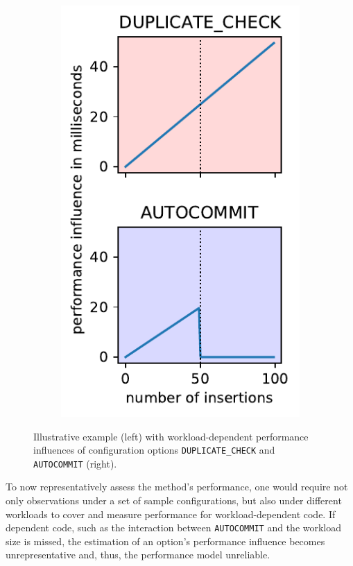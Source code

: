 {\begin{figure}
\begin{subfigure}[l]{0.63\linewidth}
\end{subfigure}
	\begin{subfigure}[l]{0.35\linewidth}
		\includegraphics[width=1\linewidth]{images/influences.pdf}
	\end{subfigure}
	\caption{Illustrative example (left) with workload-dependent performance influences of configuration options \texttt{DUPLICATE\_CHECK} and \texttt{AUTOCOMMIT} (right).}
	\label{fig:intro}
\end{figure}


To now representatively assess the method's performance, one would require not only observations under a set of sample configurations, but also under different workloads to cover and measure performance for workload-dependent code. If dependent code, such as the interaction between \texttt{AUTOCOMMIT} and the workload size is missed, the estimation of an option's performance influence becomes unrepresentative and, thus, the performance model unreliable.
}

